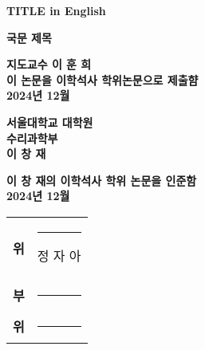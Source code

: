 \begin{titlepage}
    \begin{center}
        
        \LARGE
        \textbf{TITLE in English}
        
        \vspace{1.0cm}
        \LARGE
        \textbf{국문 제목}
        
        \vspace{1.0cm}
        \Large
        \textbf{지도교수 이 훈 희}\\
        \vspace{1.0cm}
        \textbf{이 논문을 이학석사 학위논문으로 제출햠}\\
        \textbf{2024년 12월}
        \vspace{1.0cm}

        \textbf{서울대학교 대학원}\\
        \textbf{수리과학부}\\
        \textbf{이 창 재}

        \vspace{1.0cm}
        \textbf{이 창 재의 이학석사 학위 논문을 인준함}\\
        \textbf{2024년 12월}
        
        \vfill
      
        \begin{tabular}{cc}
        \textbf{위} & \rule{5.0cm}{1pt} 정 자 아 \\
        \textbf{부} & \rule{5.0cm}{1.0pt}\\
        \textbf{위} & \rule{5.0cm}{1.0pt}\\
        \end{tabular}
        
    \end{center}
\end{titlepage}